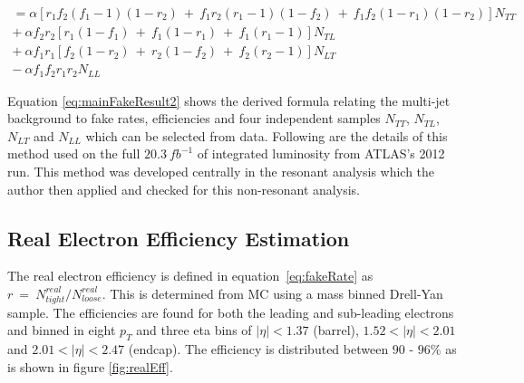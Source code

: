 \begin{equation} \label{eq:mainFakeResult2}
\begin{aligned}
   =\alpha[r_{1}f_{2}(f_{1}-1)(1-r_{2})~+~f_{1}r_{2}(r_{1}-1)(1-f_{2})~+~f_{1}f_{2}(1-r_{1})(1-r_{2})]N_{TT} \\
   +~\alpha f_{2}r_{2}[r_{1}(1-f_{1})~+~f_{1}(1-r_{1})~+~f_{1}(r_{1}-1)]N_{TL} \\
   +~\alpha f_{1}r_{1}[f_{2}(1-r_{2})~+~r_{2}(1-f_{2})~+~f_{2}(r_{2}-1)]N_{LT} \\
   -~\alpha f_{1}f_{2}r_{1}r_{2}N_{LL}
\end{aligned}
\end{equation}

Equation \ref{eq:mainFakeResult2} shows the derived formula relating the multi-jet background to fake rates, efficiencies and four independent samples $N_{TT}$, $N_{TL}$, $N_{LT}$ and $N_{LL}$ which can be selected from data. Following are the details of this method used on the full $20.3~fb^{-1}$ of integrated luminosity from ATLAS's 2012 run. This method was developed centrally in the resonant analysis which the author then applied and checked for this non-resonant analysis.


\subsection{Real Electron Efficiency Estimation}

The real electron efficiency is defined in equation~\ref{eq:fakeRate} as $r~=~N^{real}_{tight}/N^{real}_{loose}$. This is determined from MC using a mass binned Drell-Yan sample. The efficiencies are found for both the leading and sub-leading electrons and binned in eight $p_{T}$ and three eta bins of $|\eta|<1.37$ (barrel), $1.52<|\eta|<2.01$ and $2.01<|\eta|<2.47$ (endcap). The efficiency is distributed between $90$ - $96\%$ as is shown in figure \ref{fig:realEff}.

